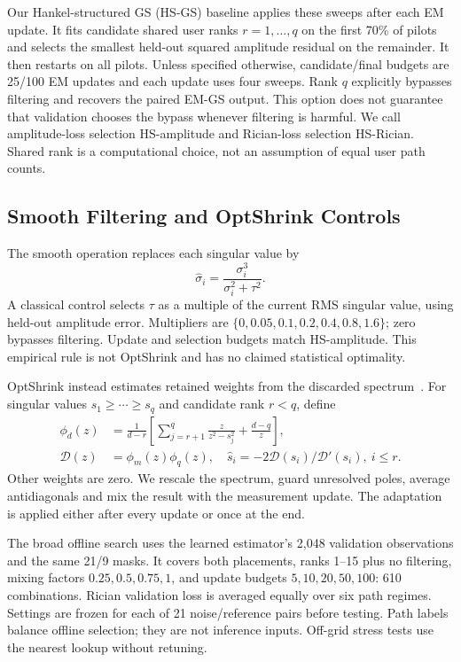 \documentclass[10pt,journal,letterpaper]{IEEEtran}
\begin{document}
Our Hankel-structured GS (HS-GS) baseline applies these sweeps after each EM update. It fits candidate shared user ranks $r=1,\ldots,q$ on the first 70\% of pilots and selects the smallest held-out squared amplitude residual on the remainder. It then restarts on all pilots. Unless specified otherwise, candidate/final budgets are 25/100 EM updates and each update uses four sweeps. Rank $q$ explicitly bypasses filtering and recovers the paired EM-GS output. This option does not guarantee that validation chooses the bypass whenever filtering is harmful. We call amplitude-loss selection HS-amplitude and Rician-loss selection HS-Rician. Shared rank is a computational choice, not an assumption of equal user path counts.

\subsection{Smooth Filtering and OptShrink Controls}
The smooth operation replaces each singular value by
\begin{equation}
 \widehat\sigma_i=\frac{\sigma_i^3}{\sigma_i^2+\tau^2}.
 \label{eq:shrink}
\end{equation}
A classical control selects $\tau$ as a multiple of the current RMS singular value, using held-out amplitude error. Multipliers are $\{0,0.05,0.1,0.2,0.4,0.8,1.6\}$; zero bypasses filtering. Update and selection budgets match HS-amplitude. This empirical rule is not OptShrink and has no claimed statistical optimality.

OptShrink instead estimates retained weights from the discarded spectrum~\cite{nadakuditi2014}. For singular values $s_1\ge\cdots\ge s_q$ and candidate rank $r<q$, define
\begin{align}
 \phi_d(z)&=\frac{1}{d-r}\left[\sum_{j=r+1}^{q}\frac{z}{z^2-s_j^2}+\frac{d-q}{z}\right],\nonumber\\
 \mathcal D(z)&=\phi_m(z)\phi_q(z),\quad
 \widehat s_i=-2\mathcal D(s_i)/\mathcal D'(s_i),\ i\le r.
\end{align}
Other weights are zero. We rescale the spectrum, guard unresolved poles, average antidiagonals and mix the result with the measurement update. The adaptation is applied either after every update or once at the end.

The broad offline search uses the learned estimator's 2,048 validation observations and the same 21/9 masks. It covers both placements, ranks 1--15 plus no filtering, mixing factors $0.25,0.5,0.75,1$, and update budgets $5,10,20,50,100$: 610 combinations. Rician validation loss is averaged equally over six path regimes. Settings are frozen for each of 21 noise/reference pairs before testing. Path labels balance offline selection; they are not inference inputs. Off-grid stress tests use the nearest lookup without retuning.
\end{document}
